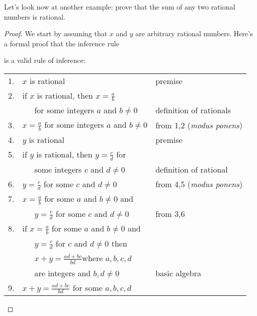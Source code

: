 \medskip

Let's look now at another example: prove that the sum of any two rational numbers is
rational. 
\begin{proof}
We start by assuming that $x$ and $y$ are arbitrary rational numbers.
Here's a formal proof that the inference rule
\begin{center}
\end{center}
is a valid rule of inference:

\breakSixByNine

\begin{center}
\begin{tabular}{r@{\ \ }l@{\qquad}l}
1.&$x$ is rational                                                 & premise\\
2.&if $x$ is rational, then $x=\frac{a}{b}$                        & \\
  & \ \ \ for some integers $a$ and $b\not=0$                      & definition of rationals \\
3.&$x=\frac{a}{b}$ for some integers $a$ and $b\not=0$             & from 1,2 (\textit{modus ponens}) \\
4.&$y$ is rational                                                 & premise\\
5.&if $y$ is rational, then $y=\frac{c}{d}$ for                    & \\
  & \ \ \ some integers $c$ and $d\not=0$                          & definition of rational\\
6.&$y=\frac{c}{d}$ for some $c$ and $d\not=0$                      & from 4,5 (\textit{modus ponens})\\
7.&$x=\frac{a}{b}$ for some $a$ and $b\not=0$ and                  & \\
  & \ \ \ $y=\frac{c}{d}$ for some $c$ and $d\not=0$               & from 3,6\\
8.&if $x=\frac{a}{b}$ for some $a$ and $b\not=0$ and               & \\
  & \ \ \ $y=\frac{c}{d}$ for $c$ and $d\not=0$ then               & \\
  & \ \ \ $x+y = \frac{ad+bc}{bd}$where $a,b,c,d$                  & \\
  & \ \ \ are integers and $b,d \not=0$                            & basic algebra\\
9.&$x+y = \frac{ad+bc}{bd}$ for some $a,b,c,d$                     & \\

\end{tabular}
\end{center}
\end{proof}
